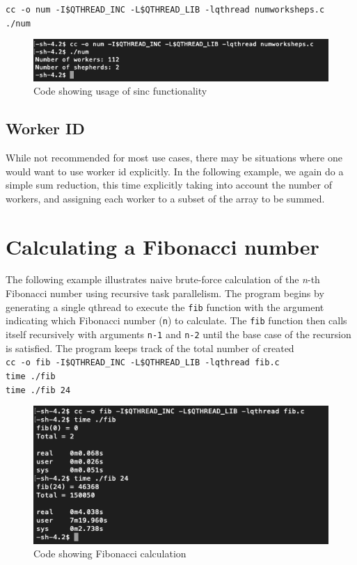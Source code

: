 \documentclass[12pt,fullpage]{article}
\begin{document}

{\footnotesize{\tt cc -o num -I\$QTHREAD\_INC -L\$QTHREAD\_LIB -lqthread numworksheps.c}}
\\
{\footnotesize{\tt ./num}}
\begin{figure}[h]
\includegraphics[scale=1.0]{num.png}
\caption{Code showing usage of sinc functionality}
\end{figure}

\subsection{Worker ID}

While not recommended for most use cases, there may be situations where one
would want to use worker id explicitly. In the following example, we again do a
simple sum reduction, this time explicitly taking into account the number of
workers, and assigning each worker to a subset of the array to be summed.





\newpage
\section{Calculating a Fibonacci number}

The following example illustrates naive brute-force calculation of the {\it n}-th Fibonacci number using recursive task parallelism. The program begins by generating a single qthread to execute the {\tt fib} function with the argument indicating which Fibonacci number ({\tt n}) to calculate.  The {\tt fib} function then calls itself recursively with arguments {\tt n-1} and {\tt n-2} until the base case of the recursion is satisfied. The program keeps track of the total number of created
\\
{\footnotesize{\tt cc -o fib -I\$QTHREAD\_INC -L\$QTHREAD\_LIB -lqthread fib.c}}
\\
{\footnotesize{\tt time ./fib}}
\\
{\footnotesize{\tt time ./fib 24}}

\begin{figure}[h]
\includegraphics[scale=0.96]{fib.png}
\caption{Code showing Fibonacci calculation}
\end{figure}
\end{document}
